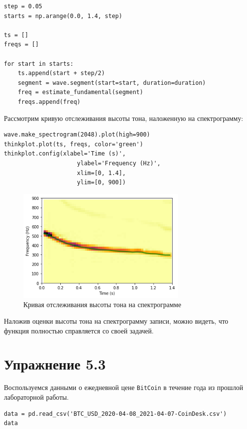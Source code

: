 \documentclass[a4paper,12pt]{report}
\begin{document}
\begin{lstlisting}[caption=Отслеживание высоты тона]
step = 0.05
starts = np.arange(0.0, 1.4, step)

ts = []
freqs = []

for start in starts:
    ts.append(start + step/2)
    segment = wave.segment(start=start, duration=duration)
    freq = estimate_fundamental(segment)
    freqs.append(freq)
\end{lstlisting}

Рассмотрим кривую отслеживания высоты тона, наложенную на спектрограмму:

\begin{lstlisting}[caption=Кривая отслеживания высоты тона на спектрограмме]
wave.make_spectrogram(2048).plot(high=900)
thinkplot.plot(ts, freqs, color='green')
thinkplot.config(xlabel='Time (s)', 
                     ylabel='Frequency (Hz)',
                     xlim=[0, 1.4],
                     ylim=[0, 900])
\end{lstlisting}

\begin{figure}[H]
        \centering
        \includegraphics[width=0.75\textwidth]{lab5_fig2_2.png}
        \caption{Кривая отслеживания высоты тона на спектрограмме}
        \label{fig:lab5_fig2_2}
\end{figure}

Наложив оценки высоты тона на спектрограмму записи, можно видеть, что функция полностью справляется со своей задачей.

\chapter{Упражнение 5.3}

Воспользуемся данными о ежедневной цене \texttt{BitCoin} в течение года из прошлой лабораторной работы.

\begin{lstlisting}[caption=Таблица данных]
data = pd.read_csv('BTC_USD_2020-04-08_2021-04-07-CoinDesk.csv')
data
\end{lstlisting}
\end{document}
